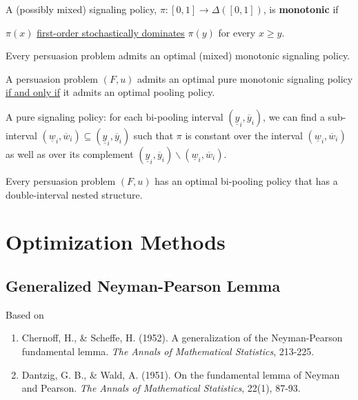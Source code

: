 \documentclass[11pt]{elegantbook}
\begin{document}
\begin{definition}
    \normalfont
    A (possibly mixed) signaling policy, $\pi : [0, 1] \rightarrow \Delta ([0,1])$, is \textbf{monotonic} if
    \begin{center}
        $\pi(x)$ \underline{first-order stochastically dominates} $\pi(y)$ for every $x\geq y$.
    \end{center}
\end{definition}

\begin{proposition}
    Every persuasion problem admits an optimal (mixed) monotonic signaling policy.
\end{proposition}

\begin{lemma}
    A persuasion problem $(F,u)$ admits an optimal pure monotonic signaling policy \underline{if and only if} it admits an optimal pooling policy.
\end{lemma}

\begin{definition}
    \normalfont
    A pure signaling policy: for each bi-pooling interval $(\underline{y}_i,\overline{y}_i)$, we can find a sub-interval $(\underline{w}_i,\overline{w}_i) \subseteq (\underline{y}_i,\overline{y}_i)$ such that $\pi$ is constant over the interval $(\underline{w}_i,\overline{w}_i)$ as well as over its complement $(\underline{y}_i,\overline{y}_i)\backslash (\underline{w}_i,\overline{w}_i)$.
\end{definition}

\begin{corollary}
    Every persuasion problem $(F,u)$ has an optimal bi-pooling policy that has a double-interval nested structure.
\end{corollary}


\chapter{Optimization Methods}

\section{Generalized Neyman-Pearson Lemma}
Based on
\begin{enumerate}[$\circ$]
    \item Chernoff, H., \& Scheffe, H. (1952). A generalization of the Neyman-Pearson fundamental lemma. \textit{The Annals of Mathematical Statistics}, 213-225.
    \item Dantzig, G. B., \& Wald, A. (1951). On the fundamental lemma of Neyman and Pearson. \textit{The Annals of Mathematical Statistics}, 22(1), 87-93.
\end{enumerate}
\end{document}
